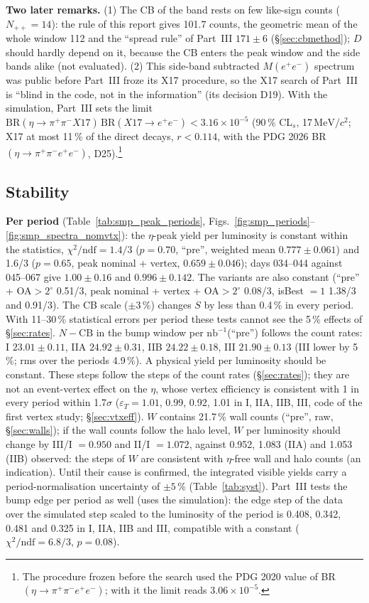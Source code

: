 \documentclass[11pt,a4paper]{article}
\newcommand{\ee}{\ensuremath{e^{+}e^{-}}\xspace}
\newcommand{\pipi}{\ensuremath{\pi^{+}\pi^{-}}\xspace}
\newcommand{\ppee}{\ensuremath{\pi^{+}\pi^{-}e^{+}e^{-}}\xspace}
\newcommand{\Mee}{\ensuremath{M(e^{+}e^{-})}\xspace}
\newcommand{\nbinv}{\ensuremath{\mathrm{nb}^{-1}}\xspace}
\newcommand{\MeVcc}{\ensuremath{\mathrm{MeV}/c^{2}}\xspace}
\begin{document}
\textbf{Two later remarks.} (1) The CB of the band rests on few like-sign counts ($N_{++}=14$): the rule of this
report gives 101.7 counts, the geometric mean of the whole window 112 and the ``spread rule'' of Part~III $171\pm6$ (\S\ref{sec:cbmethod});
$D$ should hardly depend on it, because the CB enters the peak window and the side bands alike (not evaluated). (2) This side-band
subtracted \Mee spectrum was public before Part~III froze its X17 procedure, so the X17 search of Part~III is ``blind in the code, not in the
information'' (its decision D19). With the simulation, Part~III sets the limit
$\mathrm{BR}(\eta\to\pipi X17)\,\mathrm{BR}(X17\to\ee)<3.16\times10^{-5}$ (90\,\% CL$_s$, 17\,\MeVcc; X17 at most 11\,\% of the direct decays,
$r<0.114$, with the PDG 2026 BR$(\eta\to\ppee)$, D25).\footnote{The procedure frozen before the search used the PDG 2020 value of
BR$(\eta\to\ppee)$; with it the limit reads $3.06\times10^{-5}$.}

\subsection{Stability}
\label{sec:stab}
\textbf{Per period} (Table~\ref{tab:smp_peak_periods}, Figs.~\ref{fig:smp_periods}--\ref{fig:smp_spectra_nomvtx}): the $\eta$-peak yield per
luminosity is constant within the statistics, $\chi^2/\mathrm{ndf}=1.4/3$ ($p=0.70$, ``pre'', weighted mean $0.777\pm0.061$) and 1.6/3 ($p=0.65$,
peak nominal + vertex, $0.659\pm0.046$); days 034--044 against 045--067 give $1.00\pm0.16$ and $0.996\pm0.142$. The variants are also constant
(``pre'' + OA$>2^\circ$ 0.51/3, peak nominal + vertex + OA$>2^\circ$ 0.08/3, isBest $=1$ 1.38/3 and 0.91/3). The CB scale ($\pm3$\,\%) changes $S$ by less than
0.4\,\% in every period. With 11--30\,\% statistical errors per period these tests cannot see the 5\,\% effects of \S\ref{sec:rates}. $N-\mathrm{CB}$ in the
bump window per \nbinv (``pre'') follows the count rates: I $23.01\pm0.11$, IIA $24.92\pm0.31$, IIB $24.22\pm0.18$, III $21.90\pm0.13$ (III lower by
5\,\%; rms over the periods 4.9\,\%). A physical yield per luminosity should be constant. These steps follow the steps of the count rates
(\S\ref{sec:rates}); they are not an event-vertex effect on the $\eta$, whose vertex efficiency is consistent with 1 in every period within
1.7$\sigma$ ($\varepsilon_T=1.01$, 0.99, 0.92, 1.01 in I, IIA, IIB, III, code of the first vertex study; \S\ref{sec:vtxeff}). $W$ contains
21.7\,\% wall counts (``pre'', raw, \S\ref{sec:walls}); if the wall counts follow the halo level, $W$ per luminosity should change by III/I $=0.950$
and II/I $=1.072$, against 0.952, 1.083 (IIA) and 1.053 (IIB) observed: the steps of $W$ are consistent with $\eta$-free wall and halo counts
(an indication). Until their cause is confirmed, the integrated visible yields carry a period-normalisation uncertainty
of $\pm5$\,\% (Table~\ref{tab:syst}). Part~III tests the bump edge per period as well (uses the simulation): the edge step of the data
over the simulated step scaled to the luminosity of the period is 0.408, 0.342, 0.481 and 0.325 in I, IIA, IIB and III, compatible
with a constant ($\chi^2/\mathrm{ndf}=6.8/3$, $p=0.08$).
\end{document}
